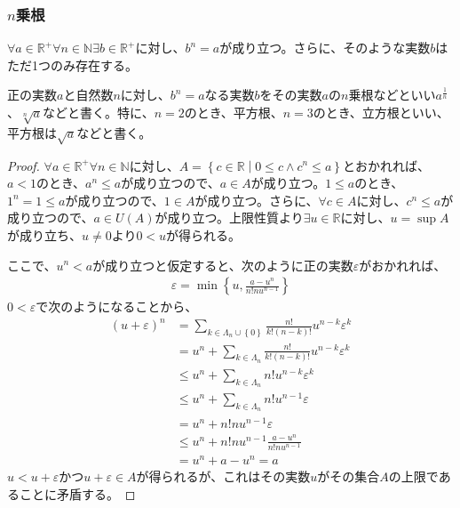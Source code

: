 \documentclass[dvipdfmx]{jsarticle}
\begin{document}
\subsubsection{$n$乗根}%
\begin{thm}\label{4.1.1.23}
$\forall a \in \mathbb{R}^{+}\forall n \in \mathbb{N}\exists b \in \mathbb{R}^{+}$に対し、$b^{n} = a$が成り立つ。さらに、そのような実数$b$はただ1つのみ存在する。
\end{thm}
\begin{dfn}
正の実数$a$と自然数$n$に対し、$b^{n} = a$なる実数$b$をその実数$a$の$n$乗根などといい$a^{\frac{1}{n}}$、$\sqrt[n]{a}$などと書く。特に、$n = 2$のとき、平方根、$n = 3$のとき、立方根といい、平方根は$\sqrt{a}$などと書く。
\end{dfn}
\begin{proof}
$\forall a \in \mathbb{R}^{+}\forall n \in \mathbb{N}$に対し、$A = \left\{ c \in \mathbb{R} \middle| 0 \leq c \land c^{n} \leq a \right\}$とおかれれば、$a < 1$のとき、$a^{n} \leq a$が成り立つので、$a \in A$が成り立つ。$1 \leq a$のとき、$1^{n} = 1 \leq a$が成り立つので、$1 \in A$が成り立つ。さらに、$\forall c \in A$に対し、$c^{n} \leq a$が成り立つので、$a \in U(A)$が成り立つ。上限性質より$\exists u \in \mathbb{R}$に対し、$u = \sup A$が成り立ち、$u \neq 0$より$0 < u$が得られる。\par
ここで、$u^{n} < a$が成り立つと仮定すると、次のように正の実数$\varepsilon$がおかれれば、
\begin{align*}
\varepsilon = \min\left\{ u,\frac{a - u^{n}}{n!nu^{n - 1}} \right\}
\end{align*}
$0 < \varepsilon$で次のようになることから、
\begin{align*}
(u + \varepsilon)^{n} &= \sum_{k \in \varLambda_{n} \cup \left\{ 0 \right\}} {\frac{n!}{k!(n - k)!}u^{n - k}\varepsilon^{k}}\\ 
&= u^{n} + \sum_{k \in \varLambda_{n}} {\frac{n!}{k!(n - k)!}u^{n - k}\varepsilon^{k}}\\ 
&\leq u^{n} + \sum_{k \in \varLambda_{n}} {n!u^{n - k}\varepsilon^{k}}\\ 
&\leq u^{n} + \sum_{k \in \varLambda_{n}} {n!u^{n - 1}\varepsilon}\\ 
&= u^{n} + n!nu^{n - 1}\varepsilon\\ 
&\leq u^{n} + n!nu^{n - 1}\frac{a - u^{n}}{n!nu^{n - 1}}\\ 
&= u^{n} + a - u^{n} = a
\end{align*}
$u < u + \varepsilon$かつ$u + \varepsilon \in A$が得られるが、これはその実数$u$がその集合$A$の上限であることに矛盾する。\par

\end{proof}
\end{document}
